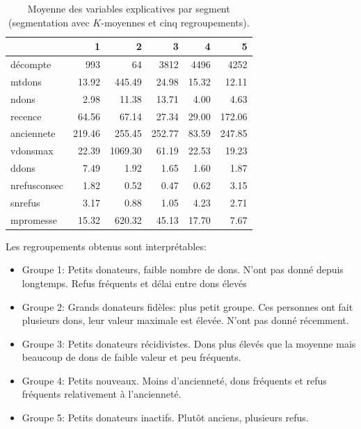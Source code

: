 \documentclass[
  11pt,
  letterpaper,
]{scrbook}
\newenvironment{Shaded}{\begin{snugshade}}{\end{snugshade}}
\newcommand{\AttributeTok}[1]{\textcolor[rgb]{0.40,0.45,0.13}{#1}}
\newcommand{\FunctionTok}[1]{\textcolor[rgb]{0.28,0.35,0.67}{#1}}
\newcommand{\NormalTok}[1]{\textcolor[rgb]{0.00,0.23,0.31}{#1}}
\newcommand{\SpecialCharTok}[1]{\textcolor[rgb]{0.37,0.37,0.37}{#1}}
\providecommand{\tightlist}{%
  \setlength{\itemsep}{0pt}\setlength{\parskip}{0pt}}\usepackage{longtable,booktabs,array}
\theoremstyle{definition}
\theoremstyle{remark}
\begin{document}
\begin{Shaded}
\end{Shaded}

\begin{longtable}[]{@{}lrrrrr@{}}

\caption{\label{tbl-kmoy5resume}Moyenne des variables explicatives par
segment (segmentation avec \(K\)-moyennes et cinq regroupements).}

\tabularnewline

\toprule\noalign{}
& 1 & 2 & 3 & 4 & 5 \\
\midrule\noalign{}
\endhead
\bottomrule\noalign{}
\endlastfoot
décompte & 993 & 64 & 3812 & 4496 & 4252 \\
mtdons & 13.92 & 445.49 & 24.98 & 15.32 & 12.11 \\
ndons & 2.98 & 11.38 & 13.71 & 4.00 & 4.63 \\
recence & 64.56 & 67.14 & 27.34 & 29.00 & 172.06 \\
anciennete & 219.46 & 255.45 & 252.77 & 83.59 & 247.85 \\
vdonsmax & 22.39 & 1069.30 & 61.19 & 22.53 & 19.23 \\
ddons & 7.49 & 1.92 & 1.65 & 1.60 & 1.87 \\
nrefusconsec & 1.82 & 0.52 & 0.47 & 0.62 & 3.15 \\
snrefus & 3.17 & 0.88 & 1.05 & 4.23 & 2.71 \\
mpromesse & 15.32 & 620.32 & 45.13 & 17.70 & 7.67 \\

\end{longtable}

Les regroupements obtenus sont interprétables:

\begin{itemize}
\tightlist
\item
  Groupe 1: Petits donateurs, faible nombre de dons. N'ont pas donné
  depuis longtemps. Refus fréquents et délai entre dons élevés
\item
  Groupe 2: Grands donateurs fidèles: plus petit groupe. Ces personnes
  ont fait plusieurs dons, leur valeur maximale est élevée. N'ont pas
  donné récemment.
\item
  Groupe 3: Petits donateurs récidivistes. Dons plus élevés que la
  moyenne mais beaucoup de dons de faible valeur et peu fréquents.
\item
  Groupe 4: Petits nouveaux. Moins d'ancienneté, dons fréquents et refus
  fréquents relativement à l'ancienneté.
\item
  Groupe 5: Petits donateurs inactifs. Plutôt anciens, plusieurs refus.
\end{itemize}
\end{document}
